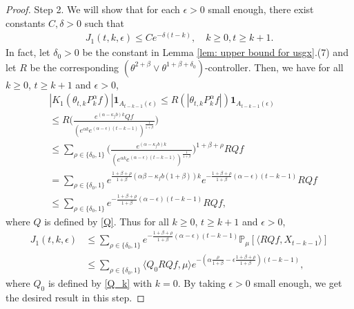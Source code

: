 \documentclass[12pt,a4paper]{amsart}
\theoremstyle{plain}
\theoremstyle{definition}
\numberwithin{equation}{section}
\begin{document}
\begin{proof}
Step 2. We will show that for each $\epsilon>0$ small enough, there exist constants $C, \delta>0$ such that
\begin{equation}\begin{split}
\label{lemma31q}
    J_1(t,k,\epsilon)
    \leq Ce^{-\delta (t-k)},
    \quad k\geq 0, t\geq k+1.
\end{split}\end{equation}
    In fact, let $\delta_0 >0$ be the constant in Lemma \ref{lem: upper bound for usgx}.(7) and let $R$ be the corresponding $(\theta^{2+\beta}\vee \theta^{1+\beta+\delta_0})$-controller.
    Then, we have for all $k\geq 0$, $t\geq k+1$ and $\epsilon> 0$,
\begin{equation}\begin{split}
    & |K_1(\theta_{t,k}P^\alpha_k f)|\mathbf{1}_{A_{t-k-1}(\epsilon)}
    \leq R(|\theta_{t,k}P^\alpha_k f|)\mathbf{1}_{A_{t-k-1}(\epsilon)}
    \\&\leq R \Big(\frac{e^{(\alpha-\kappa_fb)k} Qf}{(e^{\alpha k}e^{(\alpha-\epsilon)(t-k-1)})^\frac{1}{1+\beta}}\Big)
    \\&\leq \sum_{\rho \in \{\delta_0, 1\}}\Big(\frac{e^{(\alpha-\kappa_fb)k}}{(e^{\alpha k}e^{(\alpha-\epsilon)(t-k-1)})^\frac{1}{1+\beta}}\Big)^{1+\beta+ \rho} RQf
    \\&=\sum_{\rho \in \{\delta_0, 1\}}e^{\frac{1+\beta + \rho}{1+\beta}(\alpha\beta-\kappa_fb(1+\beta))k}e^{-\frac{1+\beta+\rho}{1+\beta} (\alpha-\epsilon)(t-k-1)}RQf
    \\&\leq \sum_{\rho \in \{\delta_0,1\}}e^{-\frac{1+\beta+\rho}{1+\beta}(\alpha-\epsilon)(t-k-1)}RQf,
\end{split}\end{equation}
    where $Q$ is defined by \eqref{Q}.
    Thus for all $k\geq 0$, $t\geq k+1$ and $\epsilon> 0$,
\begin{equation}\begin{split}
\label{eq: estimate of J1}
    J_1(t,k,\epsilon)&
    \leq \sum_{\rho \in \{\delta_0,1\}}e^{-\frac{1+\beta+\rho}{1+\beta}(\alpha-\epsilon)(t-k-1)}\mathbb{P}_{\mu}[\langle RQf,X_{t-k-1}\rangle]\\
    & \leq \sum_{\rho \in \{\delta_0,1\}} \langle Q_0 RQf, \mu \rangle e^{-(\alpha\frac{\rho}{1+\beta}-\epsilon\frac{1+\beta+\rho}{1+\beta})(t-k-1)},
\end{split}\end{equation}
    where $Q_0$ is defined by \eqref{Q_k} with $k=0$.
    By taking $\epsilon>0$ small enough, we get the desired result in this step.


\end{proof}
\end{document}

